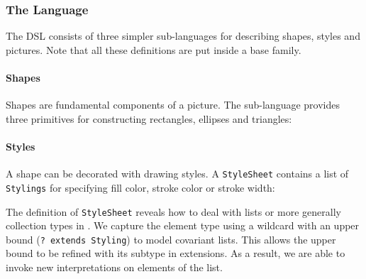 \subsubsection{The Language}
The DSL consists of three simpler sub-languages for describing shapes, styles
and pictures. Note that all these definitions are put inside a base family.

\paragraph{Shapes}
Shapes are fundamental components of a picture. The sub-language provides three
primitives for constructing rectangles, ellipses and triangles:


\paragraph{Styles}
A shape can be decorated with drawing styles. A \texttt{StyleSheet} contains a
list of \texttt{Stylings} for specifying fill color, stroke color or stroke width:


The definition of \texttt{StyleSheet} reveals how to deal with lists or more generally
collection types in \name. We capture the element type using a wildcard with an upper
bound (\texttt{? extends Styling}) to model covariant lists. This allows the
upper bound to be refined with its subtype in extensions. As a result, we are
able to invoke new interpretations on elements of the list.


